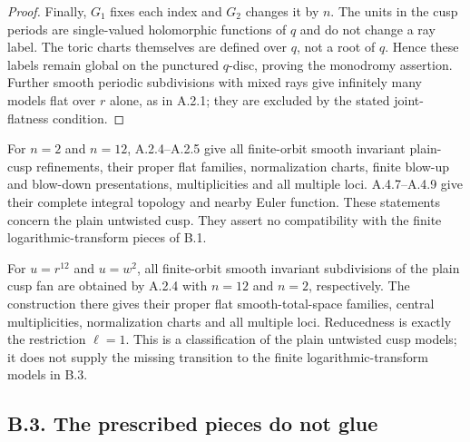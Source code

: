\begin{proof}
Finally, $G_1$ fixes each index and $G_2$ changes it
by $n$. The units in the cusp periods are
single-valued holomorphic functions of $q$ and do
not change a ray label. The toric charts themselves
are defined over $q$, not a root of $q$. Hence
these labels remain global on the punctured
$q$-disc, proving the monodromy assertion. Further
smooth periodic subdivisions with mixed rays give
infinitely many models flat over $r$ alone, as in
A.2.1; they are excluded by the stated joint-flatness
condition.
\end{proof}

\begin{corollary}\label{push:B22}
For $n=2$ and $n=12$, A.2.4--A.2.5 give all
finite-orbit smooth invariant plain-cusp refinements,
their proper flat families, normalization charts,
finite blow-up and blow-down presentations,
multiplicities and all multiple loci. A.4.7--A.4.9
give their complete integral topology and nearby
Euler function. These statements concern the plain
untwisted cusp. They assert no compatibility with
the finite logarithmic-transform pieces of B.1.
\end{corollary}

\begin{corollary}\label{push:B23}
For $u=r^{12}$ and $u=w^2$, all finite-orbit smooth invariant
subdivisions of the plain cusp fan are obtained by A.2.4
with $n=12$ and $n=2$, respectively. The construction there
gives their proper flat smooth-total-space families,
central multiplicities, normalization charts and all
multiple loci. Reducedness is exactly the restriction
$\ell=1$. This is a classification of the plain untwisted
cusp models; it does not supply the missing transition to
the finite logarithmic-transform models in B.3.
\end{corollary}

\subsection{B.3. The prescribed pieces do not glue}

